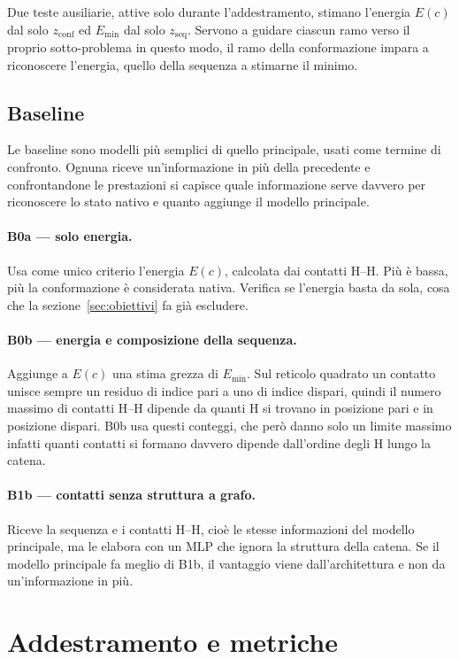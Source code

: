 \documentclass[11pt,a4paper]{article}
\newcommand{\Emin}{E_{\min}}
\newcommand{\zconf}{z_{\text{conf}}}
\newcommand{\zseq}{z_{\text{seq}}}
\begin{document}
Due teste ausiliarie, attive solo durante l'addestramento, stimano l'energia $E(c)$ dal solo $\zconf$ ed $\Emin$ dal solo $\zseq$. Servono a guidare ciascun ramo verso il proprio sotto-problema in questo modo, il ramo della conformazione impara a riconoscere l'energia, quello della sequenza a stimarne il minimo.

\subsection{Baseline}
\label{sec:baseline}

Le baseline sono modelli più semplici di quello principale, usati come termine di confronto. Ognuna riceve un'informazione in più della precedente e confrontandone le prestazioni si capisce quale informazione serve davvero per riconoscere lo stato nativo e quanto aggiunge il modello principale.

\paragraph{B0a --- solo energia.} Usa come unico criterio l'energia $E(c)$, calcolata dai contatti H--H. Più è bassa, più la conformazione è considerata nativa. Verifica se l'energia basta da sola, cosa che la sezione~\ref{sec:obiettivi} fa già escludere.

\paragraph{B0b --- energia e composizione della sequenza.} Aggiunge a $E(c)$ una stima grezza di $\Emin$. Sul reticolo quadrato un contatto unisce sempre un residuo di indice pari a uno di indice dispari, quindi il numero massimo di contatti H--H dipende da quanti H si trovano in posizione pari e in posizione dispari. B0b usa questi conteggi, che però danno solo un limite massimo infatti quanti contatti si formano davvero dipende dall'ordine degli H lungo la catena.

\paragraph{B1b --- contatti senza struttura a grafo.} Riceve la sequenza e i contatti H--H, cioè le stesse informazioni del modello principale, ma le elabora con un MLP che ignora la struttura della catena. Se il modello principale fa meglio di B1b, il vantaggio viene dall'architettura e non da un'informazione in più.

\section{Addestramento e metriche}
\label{sec:training}
\end{document}
